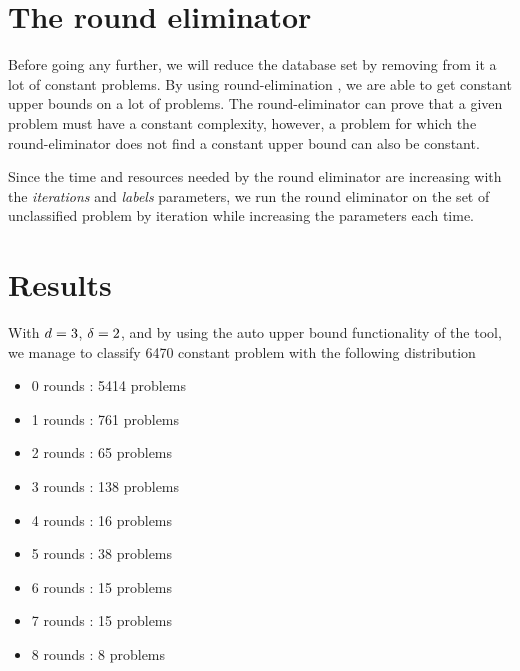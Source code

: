 \section{The round eliminator}
Before going any further, we will reduce the database set by removing from it a lot of constant problems.
By using round-elimination \cite{round-eliminator}, we are able to get constant upper bounds on a lot of problems. The round-eliminator can prove that a given problem must have a constant complexity, however, a problem for which the round-eliminator does not find a constant upper bound can also be constant.

Since the time and resources needed by the round eliminator are increasing with the \textit{iterations} and \textit{labels} parameters, we run the round eliminator on the set of unclassified problem by iteration while increasing the parameters each time.

\section{Results}
With $d = 3$, $\delta = 2$, and by using the auto upper bound functionality of the tool, we manage to classify 6470 constant problem with the following distribution 
\begin{itemize}
    \item 0 rounds : 5414 problems
    \item 1 rounds : 761 problems
    \item 2 rounds : 65 problems
    \item 3 rounds : 138 problems
    \item 4 rounds : 16 problems
    \item 5 rounds : 38 problems
    \item 6 rounds : 15 problems
    \item 7 rounds : 15 problems
    \item 8 rounds : 8 problems
\end{itemize}